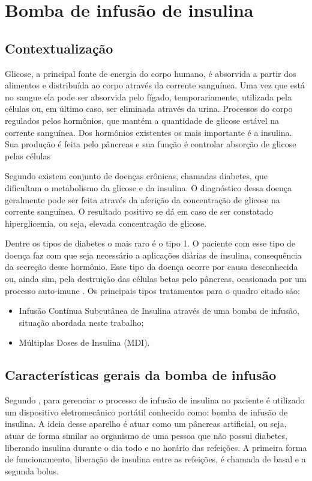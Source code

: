 \chapter{Bomba de infusão de insulina}
\section{Contextualização}
Glicose, a principal fonte de energia do corpo humano, é absorvida a partir dos alimentos e distribuída ao corpo através da corrente sanguínea. Uma vez que está no sangue ela pode ser absorvida pelo fígado, temporariamente, utilizada pela células ou, em último caso, ser eliminada através da urina. Processos do corpo regulados pelos hormônios, que mantém a quantidade de glicose estável na corrente sanguínea. Dos hormônios existentes os mais importante é a insulina. Sua produção é feita pelo pâncreas e sua função é controlar absorção de glicose pelas células \cite{sbc2014}

Segundo \cite{sbc2014} existem conjunto de doenças crônicas, chamadas diabetes, que dificultam o metabolismo da glicose e da insulina. O diagnóstico dessa doença geralmente pode ser feita através da aferição da concentração de glicose na corrente sanguínea. O resultado positivo se dá em caso de ser constatado hiperglicemia, ou seja, elevada concentração de glicose.

Dentre os tipos de diabetes o mais raro é o tipo 1. O paciente com esse tipo de doença faz com que seja necessário a aplicações diárias de insulina, consequência da secreção desse hormônio. Esse tipo da doença ocorre por causa desconhecida ou, ainda sim, pela destruição das células betas pelo pâncreas, ocasionada por um processo auto-imune \cite{galvao2013requirements}. Os principais tipos tratamentos para o quadro citado são:
\begin{itemize}
\item Infusão Contínua Subcutânea de Insulina através de uma bomba de infusão, situação abordada neste trabalho;
\item Múltiplas Doses de Insulina (MDI).
\end{itemize}

\section{Características gerais da bomba de infusão}
Segundo \cite{minicucci2008uso}, para gerenciar o processo de infusão de insulina no paciente é utilizado um dispositivo eletromecânico portátil conhecido como: bomba de infusão de insulina. A ideia desse aparelho é atuar como um pâncreas artificial, ou seja, atuar de forma similar ao organismo de uma pessoa que não possui diabetes, liberando insulina durante o dia todo e no horário das refeições. A primeira forma de funcionamento, liberação de insulina entre as refeições, é chamada de basal e a segunda bolus.

